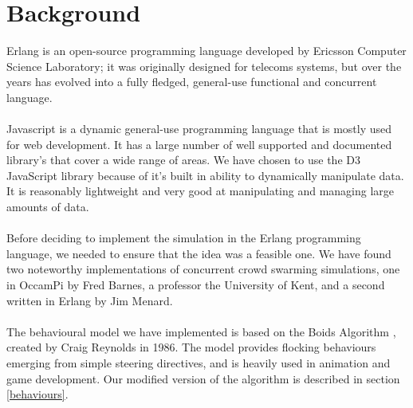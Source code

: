 \documentclass[10pt, a4paper, conference, compsocconf]{IEEEtran}
\begin{document}
\section{Background \label{background}}
Erlang is an open-source programming language developed by Ericsson Computer Science Laboratory; it was originally designed for telecoms systems, but over the years has evolved into a fully fledged, general-use functional and concurrent language.\\
\\
Javascript is a dynamic general-use programming language that is mostly used for web development. It has a large number of well supported and documented library’s that cover a wide range of areas. We have chosen to use the D3\cite{d3} JavaScript library because of it's built in ability to dynamically manipulate data. It is reasonably lightweight and very good at manipulating and managing large amounts of data.\\
\\%
Before deciding to implement the simulation in the Erlang programming language, we needed to ensure that the idea was a feasible one. We have found two noteworthy implementations of concurrent crowd swarming simulations, one in OccamPi by Fred Barnes\cite{occam_boids}, a professor the University of Kent, and a second written in Erlang by Jim Menard\cite{erlang_boids}.\\
\\%
The behavioural model we have implemented is based on the Boids Algorithm \cite{boids}, created by Craig Reynolds in 1986. The model provides flocking behaviours emerging from simple steering directives, and is heavily used in animation and game development. Our modified version of the algorithm is described in section \ref{behaviours}.\\
\end{document}
